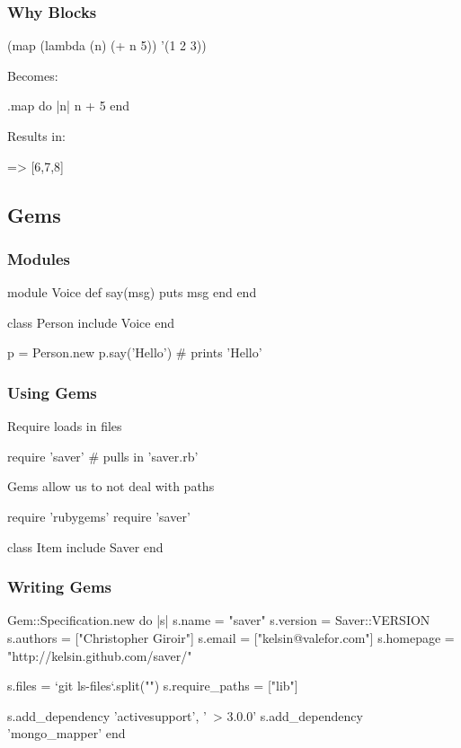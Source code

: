 \begin{frame}[fragile]
  \frametitle{Why Blocks}
  \begin{schemecode}
    (map (lambda (n)
           (+ n 5))
         '(1 2 3))
  \end{schemecode}
  Becomes:
  \begin{rubycode}
    [1,2,3].map do |n|
      n + 5
    end
  \end{rubycode}
  Results in:
  \begin{console}
    => [6,7,8]
  \end{console}
\end{frame}

\subsection{Gems}

\begin{frame}[fragile]
  \frametitle{Modules}
  \begin{rubycode}
    module Voice
      def say(msg)
        puts msg
      end
    end

    class Person
      include Voice
    end

    p = Person.new
    p.say('Hello') # prints 'Hello'
  \end{rubycode}
\end{frame}

\begin{frame}[fragile]
  \frametitle{Using Gems}
  Require loads in files
  \begin{rubycode}
    require 'saver' # pulls in 'saver.rb'
  \end{rubycode}
  Gems allow us to not deal with paths
  \begin{rubycode}
    require 'rubygems'
    require 'saver'

    class Item
      include Saver
    end
  \end{rubycode}
\end{frame}

\begin{frame}[fragile]
  \frametitle{Writing Gems}
  \begin{rubycode}
    Gem::Specification.new do |s|
      s.name        = "saver"
      s.version     = Saver::VERSION
      s.authors     = ["Christopher Giroir"]
      s.email       = ["kelsin@valefor.com"]
      s.homepage    = "http://kelsin.github.com/saver/"

      s.files         = `git ls-files`.split("\n")
      s.require_paths = ["lib"]

      s.add_dependency 'activesupport', '~> 3.0.0'
      s.add_dependency 'mongo_mapper'
    end
  \end{rubycode}
\end{frame}

